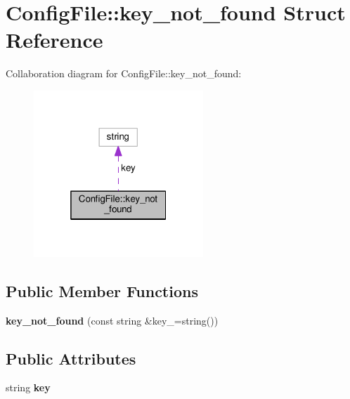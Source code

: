 \hypertarget{struct_config_file_1_1key__not__found}{}\section{Config\+File\+:\+:key\+\_\+not\+\_\+found Struct Reference}
\label{struct_config_file_1_1key__not__found}


Collaboration diagram for Config\+File\+:\+:key\+\_\+not\+\_\+found\+:\nopagebreak
\begin{figure}[H]
\begin{center}
\leavevmode
\includegraphics[width=181pt]{struct_config_file_1_1key__not__found__coll__graph}
\end{center}
\end{figure}
\subsection*{Public Member Functions}
\begin{DoxyCompactItemize}
\item 
\mbox{\label{struct_config_file_1_1key__not__found_aedacf2df70a4aa179448706b4862d768}} 
{\bfseries key\+\_\+not\+\_\+found} (const string \&key\+\_\+=string())
\end{DoxyCompactItemize}
\subsection*{Public Attributes}
\begin{DoxyCompactItemize}
\item 
\mbox{\label{struct_config_file_1_1key__not__found_a2872cbeb5ab860f357b3a58dd867b90b}} 
string {\bfseries key}
\end{DoxyCompactItemize}


